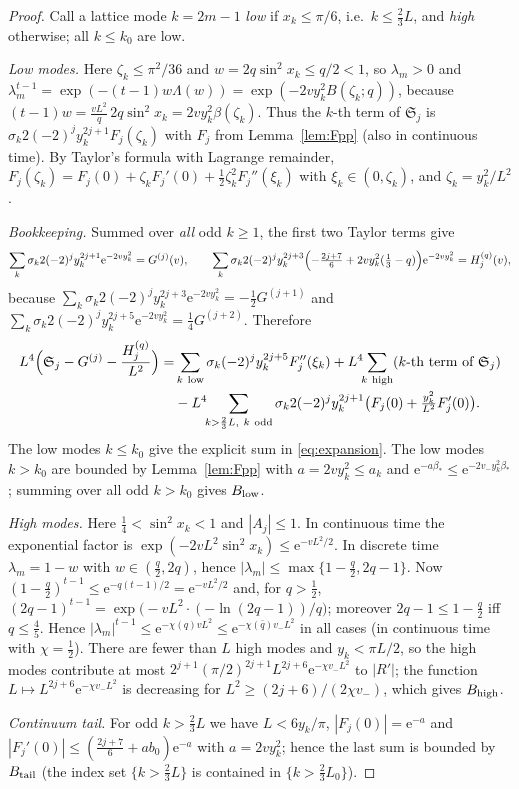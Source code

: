 \documentclass[11pt,a4paper]{article}
\theoremstyle{definition}
\theoremstyle{remark}
\newcommand{\ee}{\mathrm{e}}
\begin{document}
\begin{proof}
Call a lattice mode $k=2m-1$ \emph{low} if $x_k\le\pi/6$, i.e.\ $k\le\frac23L$, and \emph{high} otherwise; all
$k\le k_0$ are low.

\emph{Low modes.} Here $\zeta_k\le\pi^2/36$ and $w=2q\sin^2x_k\le q/2<1$, so $\lambda_m>0$ and
$\lambda_m^{t-1}=\exp(-(t-1)w\Lambda(w))=\exp(-2vy_k^2B(\zeta_k;q))$, because
$(t-1)w=\frac{vL^2}q\,2q\sin^2x_k=2vy_k^2\beta(\zeta_k)$. Thus the $k$-th term of $\mathfrak S_j$ is
$\sigma_k2(-2)^jy_k^{2j+1}F_j(\zeta_k)$ with $F_j$ from Lemma~\ref{lem:Fpp} (also in continuous time). By
Taylor's formula with Lagrange remainder,
$F_j(\zeta_k)=F_j(0)+\zeta_kF_j'(0)+\frac12\zeta_k^2F_j''(\xi_k)$ with $\xi_k\in(0,\zeta_k)$, and
$\zeta_k=y_k^2/L^2$.

\emph{Bookkeeping.} Summed over \emph{all} odd $k\ge1$, the first two Taylor terms give
\[
 \sum_k\sigma_k2(-2)^jy_k^{2j+1}\ee^{-2vy_k^2}=G^{(j)}(v),\qquad
 \sum_k\sigma_k2(-2)^jy_k^{2j+3}\Bigl(-\tfrac{2j+7}6+2vy_k^2(\tfrac13-q)\Bigr)\ee^{-2vy_k^2}=H_j^{(q)}(v),
\]
because $\sum_k\sigma_k2(-2)^jy_k^{2j+3}\ee^{-2vy_k^2}=-\frac12G^{(j+1)}$ and
$\sum_k\sigma_k2(-2)^jy_k^{2j+5}\ee^{-2vy_k^2}=\frac14G^{(j+2)}$. Therefore
\begin{align*}
 L^4\Bigl(\mathfrak S_j-G^{(j)}-\frac{H_j^{(q)}}{L^2}\Bigr)
 =&\sum_{k\ \rm low}\sigma_k(-2)^jy_k^{2j+5}F_j''(\xi_k)
  +L^4\!\!\sum_{k\ \rm high}(\text{$k$-th term of }\mathfrak S_j)\\
  &-L^4\!\!\sum_{k>\frac23L,\ k\ \rm odd}\sigma_k2(-2)^jy_k^{2j+1}\bigl(F_j(0)+\tfrac{y_k^2}{L^2}F_j'(0)\bigr).
\end{align*}
The low modes $k\le k_0$ give the explicit sum in \eqref{eq:expansion}. The low modes $k>k_0$ are bounded by
Lemma~\ref{lem:Fpp} with $a=2vy_k^2\le a_k$ and $\ee^{-a\beta_*}\le\ee^{-2v_-y_k^2\beta_*}$; summing over all odd
$k>k_0$ gives $B_{\rm low}$.

\emph{High modes.} Here $\frac14<\sin^2x_k<1$ and $|A_j|\le1$. In continuous time the exponential factor is
$\exp(-2vL^2\sin^2x_k)\le\ee^{-vL^2/2}$. In discrete time $\lambda_m=1-w$ with $w\in(\frac q2,2q)$, hence
$|\lambda_m|\le\max\{1-\frac q2,2q-1\}$. Now $(1-\frac q2)^{t-1}\le\ee^{-q(t-1)/2}=\ee^{-vL^2/2}$ and, for $q>\frac12$,
$(2q-1)^{t-1}=\exp\bigl(-vL^2\cdot(-\ln(2q-1))/q\bigr)$; moreover $2q-1\le1-\frac q2$ iff $q\le\frac45$. Hence
$|\lambda_m|^{t-1}\le\ee^{-\chi(q)vL^2}\le\ee^{-\chi(\bar q)v_-L^2}$ in all cases (in continuous time with
$\chi=\frac12$). There are fewer than $L$ high modes and $y_k<\pi L/2$, so the
high modes contribute at most $2^{j+1}(\pi/2)^{2j+1}L^{2j+6}\ee^{-\chi v_-L^2}$ to $|R'|$; the function
$L\mapsto L^{2j+6}\ee^{-\chi v_-L^2}$ is decreasing for $L^2\ge(2j+6)/(2\chi v_-)$, which gives $B_{\rm high}$.

\emph{Continuum tail.} For odd $k>\frac23L$ we have $L<6y_k/\pi$, $|F_j(0)|=\ee^{-a}$ and
$|F_j'(0)|\le(\frac{2j+7}6+ab_0)\ee^{-a}$ with $a=2vy_k^2$; hence the last sum is bounded by $B_{\rm tail}$ (the index
set $\{k>\frac23L\}$ is contained in $\{k>\frac23L_0\}$).
\end{proof}
\end{document}
